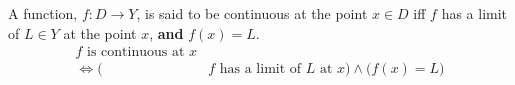 \begin{definition}
    A function, $f:D\rightarrow Y$, is said to be continuous at the point $x\in D$ iff $f$ has a limit of $L\in Y$ at the point $x$, \textbf{and} $f(x)=L$.
    \begin{align}
        \text{$f$ is continuous at $x$}&\\
            \iff\bigg(
                &\text{$f$ has a limit of $L$ at $x$}
            \bigg)\land\bigg(
                f(x)=L
            \bigg)
    \end{align}
\end{definition}
